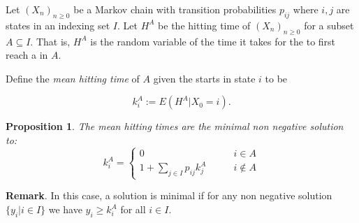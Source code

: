 \documentclass[12pt]{article}
\newtheorem{prop}{Proposition}
\begin{document}
Let $(X_n)_{n\ge 0}$ be a Markov chain with transition probabilities $p_{ij}$ where $i,j$ are states in an indexing set $I$.  Let $H^A$ be the hitting time of $(X_n)_{n\ge 0}$ for a subset $A\subseteq I$. That is, $H^A$ is the random variable of the time it takes for the  to first reach a  in $A$.

Define the \emph{mean hitting time} of $A$ given the  starts in state $i$ to be

\begin{displaymath}
k_i^A := E(H^A | X_0 = i).
\end{displaymath}

\begin{prop} The mean hitting times are the minimal non negative solution to:
\[
k_i^A = 
\begin{cases}
0 &\qquad i\in A\\
1 + \displaystyle{\sum_{j\in I} p_{ij} k_j^A} &\qquad i \notin A
\end{cases}
\] %
\end{prop}

\textbf{Remark}.  In this case, a solution is minimal if for any non negative solution $\{y_i | i \in I\}$ we have $y_i \ge k_i^A$ for all $i\in I$.
\end{document}
